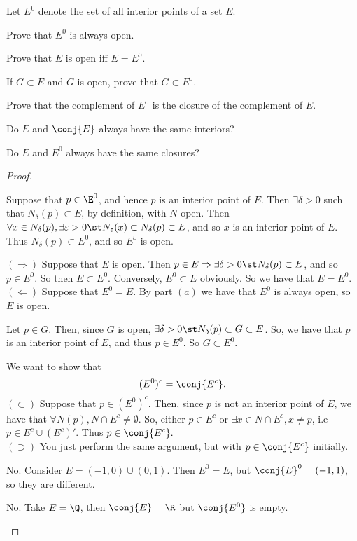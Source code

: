 \documentclass{assignment}
\begin{document}
\begin{question}[2.9]
Let $E^0$ denote the set of all interior points of a set $E$. 
\begin{qparts}
\item Prove that $E^0$ is always open.
\item Prove that $E$ is open iff $E = E^0$.
\item If $G\subset E$ and $G$ is open, prove that $G\subset E^0$.
\item Prove that the complement of $E^0$ is the closure of the complement of $E$.
\item Do $E$ and $\conj{E}$ always have the same interiors?
\item Do $E$ and $E^0$ always have the same closures?
\end{qparts}
\end{question}
\begin{proof}\leavevmode
\begin{qparts}
  \item Suppose that $p\in\E^0$, and hence $p$ is an interior point of $E$. Then $\exists\delta > 0$ 
  such that $N_\delta(p) \subset E$, by definition, with $N$ open. Then $\forall x\in N_\delta(p),
  \exists \varepsilon > 0 \st N_\varepsilon(x)\subset N_\delta(p) \subset E$, and so $x$ is an interior
  point of $E$. Thus $N_\delta(p)\subset E^0$, and so $E^0$ is open.

  \item $(\Rightarrow)$ Suppose that $E$ is open. Then $p\in E\Rightarrow \exists\delta >0 \st N_\delta(p)
  \subset E$, and so $p\in E^0$. So then $E\subset E^0$. Conversely, $E^0\subset E$ obviously. So we 
  have that $E=E^0$. \\
  $(\Leftarrow)$ Suppose that $E^0 = E$. By part $(a)$ we have that $E^0$ is always open, so $E$ is 
  open.

  \item Let $p\in G$. Then, since $G$ is open, $\exists \delta > 0 \st N_\delta(p)\subset G\subset E$. 
  So, we have that $p$ is an interior point of $E$, and thus $p\in E^0$. So $G\subset E^0$.

  \item We want to show that $$(E^0)^c = \conj{E^c}.$$ $(\subset)$ Suppose that $p\in (E^0)^c$. Then,
  since $p$ is not an interior point of $E$, we have that $\forall N(p),  N\cap E^c \neq \emptyset.$
  So, either $p\in E^c$ or $\exists x\in N\cap E^c, x\neq p$, i.e $p\in E^c \cup (E^c)'$. Thus $p\in
  \conj{E^c}.$ \\

  $(\supset)$ You just perform the same argument, but with $p\in\conj{E^c}$ initially.

  \item No. Consider $E = (-1, 0)\cup(0,1)$. Then $E^0 = E$, but $\conj{E}^0 = (-1, 1)$, so they are
    different.

  \item No. Take $E = \Q$, then $\conj{E} = \R$ but $\conj{E^0}$ is empty.
  
  \end{qparts}
\end{proof}
\end{document}
